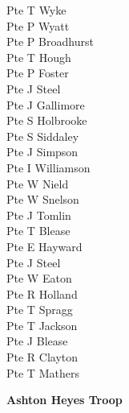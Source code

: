 \begin{multicols}{3}
  Pte T Wyke \\
  Pte P Wyatt \\
  Pte P Broadhurst \\
  Pte T Hough \\
  Pte P Foster \\
  Pte J Steel \\
  Pte J Gallimore \\
  Pte S Holbrooke \\
  Pte S Siddaley \\
  Pte J Simpson \\
  Pte I Williamson \\
  Pte W Nield \\
  Pte W Snelson \\
  Pte J Tomlin \\
  Pte T Blease \\
  Pte E Hayward \\
  Pte J Steel \\
  Pte W Eaton \\
  Pte R Holland \\
  Pte T Spragg \\
  Pte T Jackson \\
  Pte J Blease \\
  Pte R Clayton \\
  Pte T Mathers \\
\end{multicols}

\vspace*{10mm}

\begin{center}
  \Large
  \textbf{Ashton Heyes Troop}
\end{center}

\vspace*{10mm}

